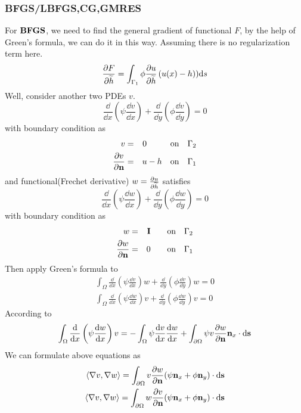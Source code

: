 \documentclass{note}
\begin{document}
\subsubsection{BFGS/LBFGS,CG,GMRES}
For $\mathbf{BFGS}$, we need to find the general gradient of functional $F$, by the help of Green's formula, we can do it in this way. Assuming there is no regularization term here.
\begin{equation}
\frac{\partial F}{\partial \widetilde{h}} = \int_{\Gamma_1} \phi \frac{\partial u}{\partial \widetilde{h}}\left(u(x)-h\right))\mathrm{d} s
\end{equation}
Well, consider another two PDEs \wrt $v$.
\begin{equation}
\frac{\dd}{\dd x}\left(\psi \frac{\dd v}{\dd x}\right) + \frac{\dd}{\dd y}\left(\phi \frac{\dd v}{\dd y}\right) = 0
\end{equation}
with boundary condition as
\begin{eqnarray}
v &=& 0 \quad\quad\;\;\;\mbox{on}\quad \Gamma_2 \\
\frac{\partial v}{\partial \mathbf{n}} &=& u-h \quad\mbox{on}\quad \Gamma_1
\end{eqnarray}
and functional(Frechet derivative) $ w = \frac{\partial u}{\partial \widetilde{h}}$ satisfies
\begin{equation}
\frac{\dd}{\dd x}\left(\psi \frac{\dd w}{\dd x}\right) + \frac{\dd}{\dd y}\left(\phi \frac{\dd w}{\dd y}\right) = 0
\end{equation}
with boundary condition as
\begin{eqnarray}
w &=& \mathbf{I}\quad\quad\mbox{on}\quad \Gamma_2 \\
\frac{\partial w}{\partial \mathbf{n}} &=& 0 \quad\quad\mbox{on}\quad \Gamma_1
\end{eqnarray}
Then apply Green's formula to
\begin{eqnarray}
\int_{\Omega} \frac{\dd}{\dd x}\left(\psi \frac{\dd v}{\dd x}\right)w + \frac{\dd}{\dd y}\left(\phi \frac{\dd v}{\dd y}\right)w = 0\\
\int_{\Omega}\frac{\dd}{\dd x}\left(\psi \frac{\dd w}{\dd x}\right)v + \frac{\dd}{\dd y}\left(\phi \frac{\dd w}{\dd y}\right)v = 0
\end{eqnarray}
According to
\begin{eqnarray}
\int_{\Omega} \frac{\mathrm{d}}{\mathrm{d} x}\left(\psi \frac{\mathrm{d} w}{\mathrm{d} x}\right)v = -\int_{\Omega}\psi\frac{\mathrm{d} v}{\mathrm{d} x}\frac{\mathrm{d} w}{\mathrm{d} x} + \int_{\partial\Omega} \psi v \frac{\partial w}{\partial \mathbf{n}} \mathbf{n}_x\cdot \mathrm{d}\mathbf{s}
\end{eqnarray}
We can formulate above equations as
\begin{eqnarray}
\langle \nabla v,\nabla w \rangle = \int_{\partial\Omega} v\frac{\partial w}{\partial \mathbf{n}} (\psi\mathbf{n}_x + \phi\mathbf{n}_y)\cdot \mathrm{d}\mathbf{s}\\
\langle \nabla v,\nabla w \rangle  = \int_{\partial\Omega} w\frac{\partial v}{\partial \mathbf{n}} (\psi\mathbf{n}_x + \phi\mathbf{n}_y)\cdot \mathrm{d}\mathbf{s}
\end{eqnarray}
\end{document}
